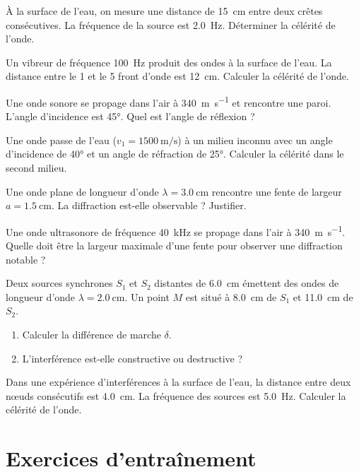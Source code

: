 \exo{} À la surface de l'eau, on mesure une distance de \SI{15}{\centi\metre} entre deux crêtes consécutives. La fréquence de la source est \SI{2.0}{\hertz}. Déterminer la célérité de l'onde.

\exo{} Un vibreur de fréquence \SI{100}{\hertz} produit des ondes à la surface de l'eau. La distance entre le 1\ier{} et le 5\ieme{} front d'onde est \SI{12}{\centi\metre}. Calculer la célérité de l'onde.


\exo{} Une onde sonore se propage dans l'air à \SI{340}{\metre\per\second} et rencontre une paroi. L'angle d'incidence est \ang{45}. Quel est l'angle de réflexion ?

\exo{} Une onde passe de l'eau ($v_1 = \SI{1500}{\metre\per\second}$) à un milieu inconnu avec un angle d'incidence de \ang{40} et un angle de réfraction de \ang{25}. Calculer la célérité dans le second milieu.


\exo{} Une onde plane de longueur d'onde $\lambda = \SI{3.0}{\centi\metre}$ rencontre une fente de largeur $a = \SI{1.5}{\centi\metre}$. La diffraction est-elle observable ? Justifier.

\exo{} Une onde ultrasonore de fréquence \SI{40}{\kilo\hertz} se propage dans l'air à \SI{340}{\metre\per\second}. Quelle doit être la largeur maximale d'une fente pour observer une diffraction notable ?


\exo{} Deux sources synchrones $S_1$ et $S_2$ distantes de \SI{6.0}{\centi\metre} émettent des ondes de longueur d'onde $\lambda = \SI{2.0}{\centi\metre}$. Un point $M$ est situé à \SI{8.0}{\centi\metre} de $S_1$ et \SI{11.0}{\centi\metre} de $S_2$. 
\begin{enumerate}
    \item Calculer la différence de marche $\delta$.
    \item L'interférence est-elle constructive ou destructive ?
\end{enumerate}

\exo{} Dans une expérience d'interférences à la surface de l'eau, la distance entre deux nœuds consécutifs est \SI{4.0}{\centi\metre}. La fréquence des sources est \SI{5.0}{\hertz}. Calculer la célérité de l'onde.

\section{Exercices d'entraînement}

